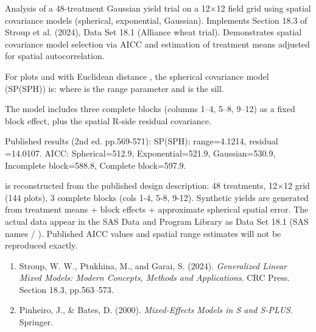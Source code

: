 \documentclass[a4paper]{book}
\begin{document}
%
\begin{Description}
Analysis of a 48-treatment Gaussian yield trial on a 12×12 field grid using
spatial covariance models (spherical, exponential, Gaussian).  Implements
Section 18.3 of Stroup et al. (2024), Data Set 18.1 (Alliance wheat trial).
Demonstrates spatial covariance model selection via AICC and estimation of
treatment means adjusted for spatial autocorrelation.
\end{Description}
%
\begin{Details}
For plots  and  with Euclidean distance , the
spherical covariance model (SP(SPH)) is:
where  is the range parameter and  is the sill.

The model includes three complete blocks (columns 1–4, 5–8, 9–12) as a
fixed block effect, plus the spatial R-side residual covariance.

Published results (2nd ed. pp.569-571):
SP(SPH): range=4.1214, residual =14.0107.
AICC: Spherical=512.9, Exponential=521.9, Gaussian=530.9,
Incomplete block=588.8, Complete block=597.9.
\end{Details}
%
\begin{Note}
  is reconstructed from the
published design description: 48 treatments, 12×12 grid (144 plots),
3 complete blocks (cols 1-4, 5-8, 9-12).  Synthetic yields are generated
from treatment means + block effects + approximate spherical spatial error.
The actual data appear in the SAS Data and Program Library as Data Set 18.1
(SAS names  / ).  Published AICC values and
spatial range estimates will not be reproduced exactly.
\end{Note}
%
\begin{References}
\begin{enumerate}

\item{} Stroup, W. W., Ptukhina, M., and Garai, S. (2024).
\emph{Generalized Linear Mixed Models: Modern Concepts, Methods and
Applications}. CRC Press. Section 18.3, pp.563–573.
\item{} Pinheiro, J., \& Bates, D. (2000).
\emph{Mixed-Effects Models in S and S-PLUS}. Springer.

\end{enumerate}

\end{References}
\end{document}
